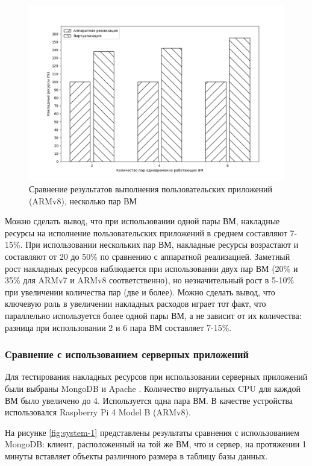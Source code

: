 \begin{figure}[h]
	\centering
	\includegraphics[width=\textwidth]{img/user-2-armv8.pdf}
	\caption{Сравнение результатов выполнения пользовательских приложений (ARMv8), несколько пар ВМ}
	\label{fig:perf-user-2-armv8}
\end{figure}

Можно сделать вывод, что при использовании одной пары ВМ, накладные ресурсы на исполнение пользовательских приложений в среднем составляют 7-15\%. При использовании нескольких пар ВМ, накладные ресурсы возрастают и составляют от 20 до 50\% по сравнению с аппаратной реализацией. Заметный рост накладных ресурсов наблюдается при использовании двух пар ВМ (20\% и 35\% для ARMv7 и ARMv8 соответственно), но незначительный рост в 5-10\% при увеличении количества пар (две и более). Можно сделать вывод, что ключевую роль в увеличении накладных расходов играет тот факт, что параллельно используется более одной пары ВМ, а не зависит от их количества: разница при использовании 2 и 6 пара ВМ составляет 7-15\%.

\subsubsection{Сравнение с использованием серверных приложений}

Для тестирования накладных ресурсов при использовании серверных приложений были выбраны MongoDB \cite{mongodb} и Apache \cite{apache}. Количество виртуальных CPU для каждой ВМ было увеличено до 4. Используется одна пара ВМ. В качестве устройства использовался Raspberry Pi 4 Model B (ARMv8).

На рисунке \ref{fig:system-1} представлены результаты сравнения с использованием\\MongoDB: клиент, расположенный на той же ВМ, что и сервер, на протяжении 1 минуты вставляет объекты различного размера в таблицу базы данных. 

